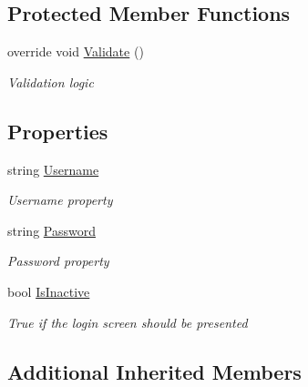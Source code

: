\subsection*{Protected Member Functions}
\begin{DoxyCompactItemize}
\item 
override void \hyperlink{class_field_service_1_1_view_models_1_1_login_view_model_af979634e56bc7c5da542d0a1e38c7344}{Validate} ()
\begin{DoxyCompactList}\small\item\em Validation logic \end{DoxyCompactList}\end{DoxyCompactItemize}
\subsection*{Properties}
\begin{DoxyCompactItemize}
\item 
string \hyperlink{class_field_service_1_1_view_models_1_1_login_view_model_aba35afcb0fde385ffebc5bb8267e4218}{Username}
\begin{DoxyCompactList}\small\item\em Username property \end{DoxyCompactList}\item 
string \hyperlink{class_field_service_1_1_view_models_1_1_login_view_model_a1da03b3071aef0fcaea92f6c8f9518fe}{Password}
\begin{DoxyCompactList}\small\item\em Password property \end{DoxyCompactList}\item 
bool \hyperlink{class_field_service_1_1_view_models_1_1_login_view_model_a896ce645e14190629e0feefb1a33b7e2}{Is\+Inactive}
\begin{DoxyCompactList}\small\item\em True if the login screen should be presented \end{DoxyCompactList}\end{DoxyCompactItemize}
\subsection*{Additional Inherited Members}


